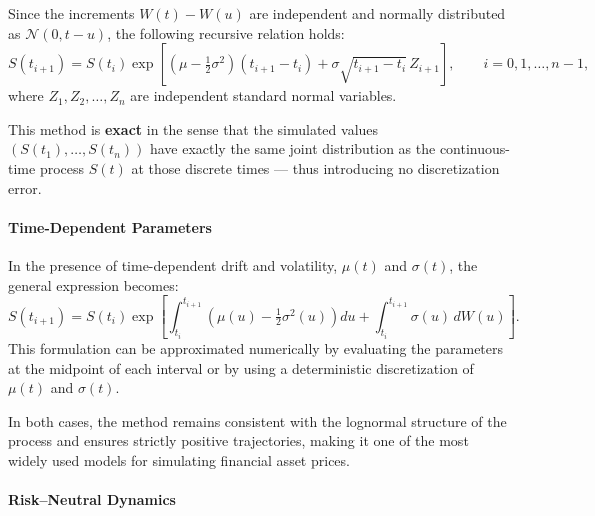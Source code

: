 Since the increments $W(t)-W(u)$ are independent and normally distributed as $\mathcal{N}(0, t-u)$, the following recursive relation holds:
\[
S(t_{i+1}) = S(t_i)\exp\!\left[\left(\mu - \tfrac{1}{2}\sigma^2\right)(t_{i+1}-t_i)
+ \sigma\sqrt{t_{i+1}-t_i}\,Z_{i+1}\right],
\qquad i = 0,1,\dots,n-1,
\]
where $Z_1, Z_2, \dots, Z_n$ are independent standard normal variables.

This method is \textbf{exact} in the sense that the simulated values $(S(t_1), \ldots, S(t_n))$ have exactly the same joint distribution as the continuous-time process $S(t)$ at those discrete times — thus introducing no discretization error.

\paragraph{Time-Dependent Parameters}

In the presence of time-dependent drift and volatility, $\mu(t)$ and $\sigma(t)$, the general expression becomes:
\[
S(t_{i+1}) = S(t_i)\exp\!\left[
\int_{t_i}^{t_{i+1}}\!\!\left(\mu(u) - \tfrac{1}{2}\sigma^2(u)\right)du
+ \int_{t_i}^{t_{i+1}}\!\!\sigma(u)\,dW(u)
\right].
\]
This formulation can be approximated numerically by evaluating the parameters at the midpoint of each interval or by using a deterministic discretization of $\mu(t)$ and $\sigma(t)$.  

In both cases, the method remains consistent with the lognormal structure of the process and ensures strictly positive trajectories, making it one of the most widely used models for simulating financial asset prices.
\paragraph{Risk--Neutral Dynamics}

